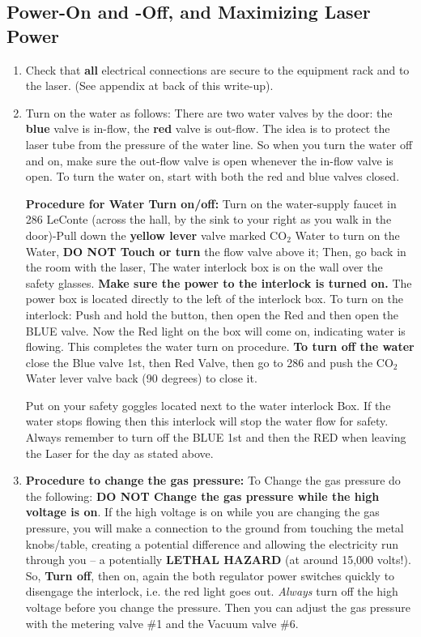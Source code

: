 \documentclass{../lab}
\begin{document}
\subsection{Power-On and -Off, and Maximizing Laser Power}

\begin{enumerate}
    \item Check that \textbf{all} electrical connections are secure to the equipment rack and to the laser. (See appendix at back of this write-up).

    \item Turn on the water as follows: There are two water valves by the door: the \textbf{blue} valve is in-flow, the \textbf{red }valve is out-flow. The idea is to protect the laser tube from the pressure of the water line. So when you turn the water off and on, make sure the out-flow valve is open whenever the in-flow valve is open. To turn the water on, start with both the red and blue valves closed.
    
    \textbf{Procedure for Water Turn on/off:} Turn on the water-supply faucet in 286 LeConte (across the hall, by the sink to your right as you walk in the door)-Pull down the \textbf{yellow lever} valve marked CO$_2$ Water to turn on the Water, \textbf{DO NOT Touch or turn} the flow valve above it; Then, go back in the room with the laser, The water interlock box is on the wall over the safety glasses. \textbf{Make sure the power to the interlock is turned on.} The power box is located directly to the left of the interlock box. To turn on the interlock: Push and hold the button, then open the Red and then open the BLUE valve. Now the Red light on the box will come on, indicating water is flowing. This completes the water turn on procedure. \textbf{To turn off the water} close the Blue valve 1st, then Red Valve, then go to 286 and push the CO$_2$ Water lever valve back (90 degrees) to close it.
    
    Put on your safety goggles located next to the water interlock Box. If the water stops flowing then this interlock will stop the water flow for safety. Always remember to turn off the BLUE 1st and then the RED when leaving the Laser for the day as stated above.
    
    \item \textbf{Procedure to change the gas pressure:} To Change the gas pressure do the following: \textbf{DO NOT Change the gas pressure while the high voltage is on}.  If the high voltage is on while you are changing the gas pressure, you will make a connection to the ground from touching the metal knobs/table, creating a potential difference and allowing the electricity run through you -- a potentially \textbf{LETHAL HAZARD} (at around 15,000 volts!). So, \textbf{Turn off}, then on, again the both regulator power switches quickly to disengage the interlock, i.e. the red light goes out. \emph{Always} turn off the high voltage before you change the pressure. Then you can adjust the gas pressure with the metering valve \#1 and the Vacuum valve \#6.
    

\end{enumerate}
\end{document}
